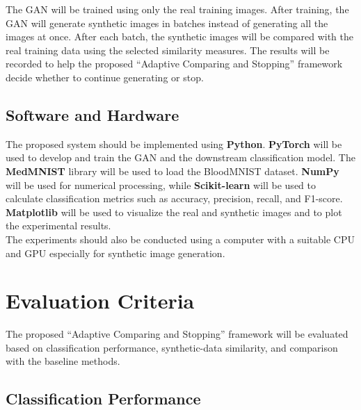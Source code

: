 \documentclass[12pt,a4paper]{report}
\begin{document}
\begin{justify}
\noindent The GAN will be trained using only the real training images. After training, the GAN will generate synthetic images in batches instead of generating all the images at once. After each batch, the synthetic images will be compared with the real training data using the selected similarity measures. The results will be recorded to help the proposed ``Adaptive Comparing and Stopping'' framework decide whether to continue generating or stop.

\subsection{Software and Hardware}

The proposed system should be implemented using \textbf{Python}.  \textbf{PyTorch} will be used to develop and train the GAN and the downstream classification model. The \textbf{MedMNIST} library will 
be used to load the BloodMNIST dataset. \textbf{NumPy} will be used for numerical processing, while \textbf{Scikit-learn} will be used to calculate classification metrics such as accuracy, precision, recall, and F1-score. \textbf{Matplotlib} will be used to visualize the real and synthetic images and to plot the experimental results. \\

\noindent The experiments should also be conducted using a computer with a suitable CPU and GPU especially for synthetic image generation.

\section{Evaluation Criteria}

The proposed ``Adaptive Comparing and Stopping'' framework will be evaluated based on classification performance, synthetic-data similarity, and comparison with the baseline methods.

\subsection{Classification Performance}


\end{justify}
\end{document}
